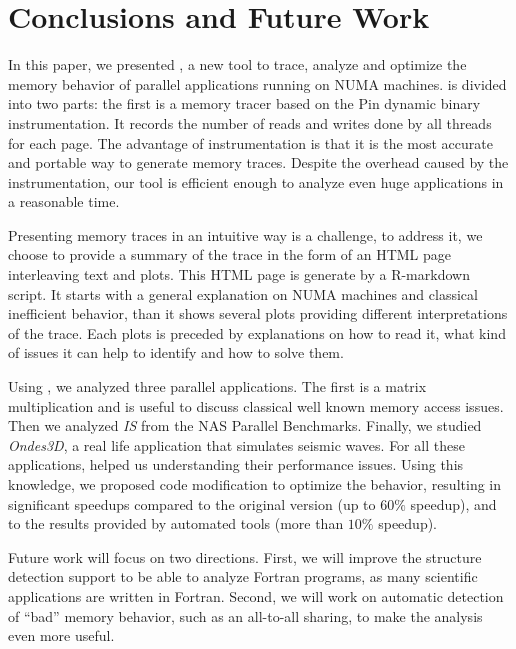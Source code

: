 
\section{Conclusions and Future Work}
\label{sec:concl}

In this paper, we presented \TABARNAC, a new tool to trace, analyze and
optimize the memory behavior of parallel applications running on NUMA
machines. \TABARNAC is divided into two parts: the first is a memory tracer
based on the Pin dynamic binary instrumentation. It records the
number of reads and writes done by all threads for each page.
The advantage of instrumentation is that it is the most
accurate and portable way to generate memory traces.
Despite the overhead caused by the instrumentation, our tool is efficient enough to analyze even huge applications in a reasonable time.

Presenting memory traces in an intuitive way is a challenge, to address it, we
choose to provide a summary of the trace in the form of an HTML page
interleaving text and plots. This HTML page is generate by a R-markdown
script. It starts with a general explanation on NUMA machines and classical
inefficient behavior, than it shows several plots providing different
interpretations of the trace. Each plots is preceded by explanations on how to
read it, what kind of issues it can help to identify and how to solve them.

Using \TABARNAC, we analyzed three parallel applications. The first is a
matrix multiplication and is useful to discuss classical well known memory access issues.
Then we analyzed \emph{IS} from the NAS Parallel Benchmarks. Finally, we studied
\emph{Ondes3D}, a real life application that simulates seismic waves. For all
these applications, \TABARNAC helped us understanding their performance issues.
Using this knowledge, we proposed code modification to optimize the behavior, resulting in
significant speedups compared to the original version (up to $60\%$ speedup),
and to the results provided by automated tools (more than $10\%$ speedup).

Future work will focus on two directions. First, we will improve the
structure detection support to be able to analyze Fortran programs, as many
scientific applications are written in Fortran. Second, we will work
on automatic detection of ``bad'' memory behavior, such as an all-to-all sharing,
to make the analysis even more useful.
